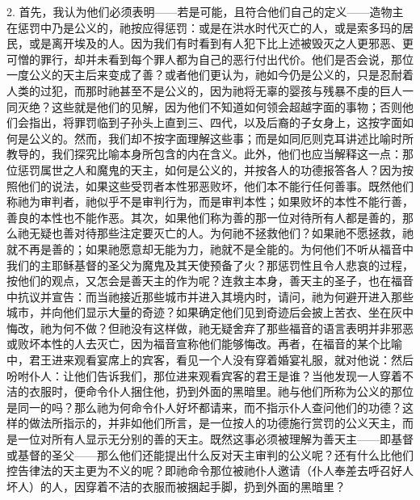 2. 首先，我认为他们必须表明——若是可能，且符合他们自己的定义——造物主在惩罚中乃是公义的，祂按应得惩罚：或是在洪水时代灭亡的人，或是索多玛的居民，或是离开埃及的人。因为我们有时看到有人犯下比上述被毁灭之人更邪恶、更可憎的罪行，却并未看到每个罪人都为自己的恶行付出代价。他们是否会说，那位一度公义的天主后来变成了善？或者他们更认为，祂如今仍是公义的，只是忍耐着人类的过犯，而那时祂甚至不是公义的，因为祂将无辜的婴孩与残暴不虔的巨人一同灭绝？这些就是他们的见解，因为他们不知道如何领会超越字面的事物；否则他们会指出，将罪罚临到子孙头上直到三、四代，以及后裔的子女身上，这按字面如何是公义的。然而，我们却不按字面理解这些事；而是如同厄则克耳讲述比喻时所教导的，我们探究比喻本身所包含的内在含义。此外，他们也应当解释这一点：那位惩罚属世之人和魔鬼的天主，如何是公义的，并按各人的功德报答各人？因为按照他们的说法，如果这些受罚者本性邪恶败坏，他们本不能行任何善事。既然他们称祂为审判者，祂似乎不是审判行为，而是审判本性；如果败坏的本性不能行善，善良的本性也不能作恶。其次，如果他们称为善的那一位对待所有人都是善的，那么祂无疑也善对待那些注定要灭亡的人。为何祂不拯救他们？如果祂不愿拯救，祂就不再是善的；如果祂愿意却无能为力，祂就不是全能的。为何他们不听从福音中我们的主耶稣基督的圣父为魔鬼及其天使预备了火？那惩罚性且令人悲哀的过程，按他们的观点，又怎会是善天主的作为呢？连救主本身，善天主的圣子，也在福音中抗议并宣告：而当祂接近那些城市并进入其境内时，请问，祂为何避开进入那些城市，并向他们显示大量的奇迹？如果确定他们见到奇迹后会披上苦衣、坐在灰中悔改，祂为何不做？但祂没有这样做，祂无疑舍弃了那些福音的语言表明并非邪恶或败坏本性的人去灭亡，因为福音宣称他们能够悔改。再者，在福音的某个比喻中，君王进来观看宴席上的宾客，看见一个人没有穿着婚宴礼服，就对他说：然后吩咐仆人：让他们告诉我们，那位进来观看宾客的君王是谁？当他发现一人穿着不洁的衣服时，便命令仆人捆住他，扔到外面的黑暗里。祂与他们所称为公义的那位是同一的吗？那么祂为何命令仆人好坏都请来，而不指示仆人查问他们的功德？这样的做法所指示的，并非如他们所言，是一位按人的功德施行赏罚的公义天主，而是一位对所有人显示无分别的善的天主。既然这事必须被理解为善天主——即基督或基督的圣父——那么他们还能提出什么反对天主审判的公义呢？还有什么比他们控告律法的天主更为不义的呢？即祂命令那位被祂仆人邀请（仆人奉差去呼召好人坏人）的人，因穿着不洁的衣服而被捆起手脚，扔到外面的黑暗里？\par

